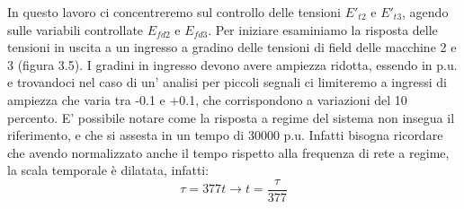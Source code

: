 \documentclass[Lau,noexaminfo]{sapthesis}
\begin{document}
\newpage	
	In questo lavoro ci concentreremo sul controllo delle tensioni $E'_{t2}$ e $E'_{t3}$, agendo sulle variabili controllate $E_{fd2}$ e $E_{fd3}$. Per iniziare esaminiamo la risposta delle tensioni in uscita a un ingresso a gradino delle tensioni di field delle macchine 2 e 3 (figura 3.5). I gradini in ingresso devono avere ampiezza ridotta, essendo in p.u. e trovandoci nel caso di un' analisi per piccoli segnali ci limiteremo a ingressi di ampiezza che varia tra -0.1 e +0.1, che corrispondono a variazioni del 10 percento. E' possibile notare come la risposta a regime del sistema non insegua il riferimento, e che si assesta in un tempo di 30000 p.u. Infatti bisogna ricordare che avendo normalizzato anche il tempo rispetto alla frequenza di rete a regime, la scala temporale è dilatata, infatti:
	\begin{equation}
	\tau=377t \rightarrow t=\frac{\tau}{377}
	\end{equation}
\end{document}
